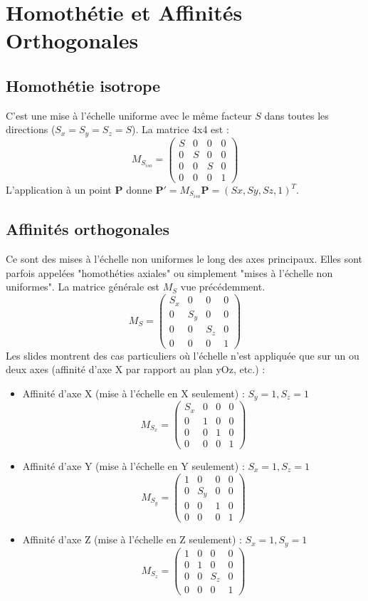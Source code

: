 \section{Homothétie et Affinités Orthogonales}
\subsection{Homothétie isotrope}
C'est une mise à l'échelle uniforme avec le même facteur \( S \) dans toutes les directions (\( S_x=S_y=S_z=S \)).
La matrice 4x4 est :
\[ M_{S_{iso}} = \begin{pmatrix} S & 0 & 0 & 0 \\ 0 & S & 0 & 0 \\ 0 & 0 & S & 0 \\ 0 & 0 & 0 & 1 \end{pmatrix} \]
L'application à un point \( \mathbf{P} \) donne \( \mathbf{P'} = M_{S_{iso}} \mathbf{P} = (S x, S y, S z, 1)^T \).
\subsection{Affinités orthogonales}
Ce sont des mises à l'échelle non uniformes le long des axes principaux. Elles sont parfois appelées "homothéties axiales" ou simplement "mises à l'échelle non uniformes".
La matrice générale est \( M_S \) vue précédemment.
\[ M_S = \begin{pmatrix} S_x & 0 & 0 & 0 \\ 0 & S_y & 0 & 0 \\ 0 & 0 & S_z & 0 \\ 0 & 0 & 0 & 1 \end{pmatrix} \]
Les slides montrent des cas particuliers où l'échelle n'est appliquée que sur un ou deux axes (affinité d'axe X par rapport au plan yOz, etc.) :
\begin{itemize}
    \item Affinité d'axe X (mise à l'échelle en X seulement) : \( S_y=1, S_z=1 \)
    \[ M_{S_x} = \begin{pmatrix} S_x & 0 & 0 & 0 \\ 0 & 1 & 0 & 0 \\ 0 & 0 & 1 & 0 \\ 0 & 0 & 0 & 1 \end{pmatrix} \]
    \item Affinité d'axe Y (mise à l'échelle en Y seulement) : \( S_x=1, S_z=1 \)
    \[ M_{S_y} = \begin{pmatrix} 1 & 0 & 0 & 0 \\ 0 & S_y & 0 & 0 \\ 0 & 0 & 1 & 0 \\ 0 & 0 & 0 & 1 \end{pmatrix} \]
    \item Affinité d'axe Z (mise à l'échelle en Z seulement) : \( S_x=1, S_y=1 \)
    \[ M_{S_z} = \begin{pmatrix} 1 & 0 & 0 & 0 \\ 0 & 1 & 0 & 0 \\ 0 & 0 & S_z & 0 \\ 0 & 0 & 0 & 1 \end{pmatrix} \]
\end{itemize}

